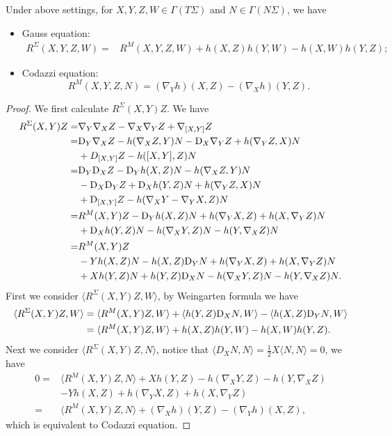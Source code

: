 \begin{thm}
    Under above settings, for $X,Y,Z,W\in\Gamma(T\Sigma)$ and $N\in\Gamma(N\Sigma)$, we have
    \begin{itemize}
        \item Gauss equation:
        \begin{align*}
            R^\Sigma(X,Y,Z,W)=&R^M(X,Y,Z,W)+h(X,Z)h(Y,W)-h(X,W)h(Y,Z);
        \end{align*}
        \item Codazzi equation:
        \[R^M(X,Y,Z,N)=(\nabla_Yh)(X,Z)-(\nabla_Xh)(Y,Z).\]
    \end{itemize}
\end{thm}
\begin{proof}
    We first calculate $R^\Sigma(X,Y)Z$.
    We have
    \begin{align*}
        R^\Sigma(X,Y)Z=&\nabla_Y\nabla_XZ-\nabla_X\nabla_YZ+\nabla_{[X,Y]}Z\\
        =&\mathrm{D}_Y\nabla_XZ-h(\nabla_XZ,Y)N-\mathrm{D}_X\nabla_YZ+h(\nabla_YZ,X)N\\
        &+D_{[X,Y]}Z-h([X,Y],Z)N\\
        =&\mathrm{D}_Y\mathrm{D}_XZ-\mathrm{D}_Yh(X,Z)N-h(\nabla_XZ,Y)N\\
        &-\mathrm{D}_X\mathrm{D}_YZ+\mathrm{D}_Xh(Y,Z)N+h(\nabla_YZ,X)N\\
        &+\mathrm{D}_{[X,Y]}Z-h(\nabla_XY-\nabla_YX,Z)N\\
        =&R^M(X,Y)Z-\mathrm{D}_Yh(X,Z)N+h(\nabla_YX,Z)+h(X,\nabla_YZ)N\\
        &+\mathrm{D}_Xh(Y,Z)N-h(\nabla_XY,Z)N-h(Y,\nabla_XZ)N\\
        =&R^M(X,Y)Z\\
        &-Yh(X,Z)N-h(X,Z)\mathrm{D}_YN+h(\nabla_YX,Z)+h(X,\nabla_YZ)N\\
        &+Xh(Y,Z)N+h(Y,Z)\mathrm{D}_XN-h(\nabla_XY,Z)N-h(Y,\nabla_XZ)N.
    \end{align*}
    First we consider $\langle R^\Sigma(X,Y)Z,W\rangle$, by Weingarten formula we have
    \begin{align*}
        \langle R^\Sigma(X,Y)Z,W\rangle&=\langle R^M(X,Y)Z,W\rangle+\langle h(Y,Z)\mathrm{D}_XN,W\rangle-\langle h(X,Z)\mathrm{D}_YN,W\rangle\\
        &=\langle R^M(X,Y)Z,W\rangle+h(X,Z)h(Y,W)-h(X,W)h(Y,Z).
    \end{align*}
    Next we consider $\langle R^\Sigma(X,Y)Z,N\rangle$, notice that $\langle D_XN,N\rangle=\frac{1}{2}X\langle N,N\rangle=0$, we have
    \begin{align*}
        0=&\langle R^M(X,Y)Z,N\rangle+Xh(Y,Z)-h(\nabla_XY,Z)-h(Y,\nabla_XZ)\\
        &-Yh(X,Z)+h(\nabla_YX,Z)+h(X,\nabla_YZ)\\
        =&\langle R^M(X,Y)Z,N\rangle+(\nabla_Xh)(Y,Z)-(\nabla_Yh)(X,Z),
    \end{align*}
    which is equivalent to Codazzi equation.
\end{proof}

